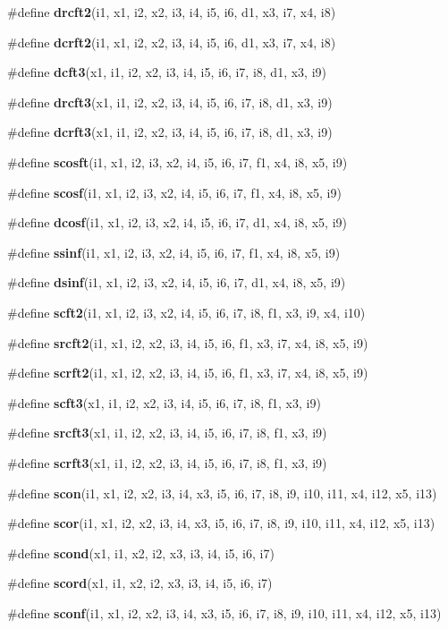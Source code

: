 \begin{CompactItemize}
\item 
\#define {\bf drcft2}(i1, x1, i2, x2, i3, i4, i5, i6, d1, x3, i7, x4, i8)
\item 
\#define {\bf dcrft2}(i1, x1, i2, x2, i3, i4, i5, i6, d1, x3, i7, x4, i8)
\item 
\#define {\bf dcft3}(x1, i1, i2, x2, i3, i4, i5, i6, i7, i8, d1, x3, i9)
\item 
\#define {\bf drcft3}(x1, i1, i2, x2, i3, i4, i5, i6, i7, i8, d1, x3, i9)
\item 
\#define {\bf dcrft3}(x1, i1, i2, x2, i3, i4, i5, i6, i7, i8, d1, x3, i9)
\item 
\#define {\bf scosft}(i1, x1, i2, i3, x2, i4, i5, i6, i7, f1, x4, i8, x5, i9)
\item 
\#define {\bf scosf}(i1, x1, i2, i3, x2, i4, i5, i6, i7, f1, x4, i8, x5, i9)
\item 
\#define {\bf dcosf}(i1, x1, i2, i3, x2, i4, i5, i6, i7, d1, x4, i8, x5, i9)
\item 
\#define {\bf ssinf}(i1, x1, i2, i3, x2, i4, i5, i6, i7, f1, x4, i8, x5, i9)
\item 
\#define {\bf dsinf}(i1, x1, i2, i3, x2, i4, i5, i6, i7, d1, x4, i8, x5, i9)
\item 
\#define {\bf scft2}(i1, x1, i2, i3, x2, i4, i5, i6, i7, i8, f1, x3, i9, x4, i10)
\item 
\#define {\bf srcft2}(i1, x1, i2, x2, i3, i4, i5, i6, f1, x3, i7, x4, i8, x5, i9)
\item 
\#define {\bf scrft2}(i1, x1, i2, x2, i3, i4, i5, i6, f1, x3, i7, x4, i8, x5, i9)
\item 
\#define {\bf scft3}(x1, i1, i2, x2, i3, i4, i5, i6, i7, i8, f1, x3, i9)
\item 
\#define {\bf srcft3}(x1, i1, i2, x2, i3, i4, i5, i6, i7, i8, f1, x3, i9)
\item 
\#define {\bf scrft3}(x1, i1, i2, x2, i3, i4, i5, i6, i7, i8, f1, x3, i9)
\item 
\#define {\bf scon}(i1, x1, i2, x2, i3, i4, x3, i5, i6, i7, i8, i9, i10, i11, x4, i12, x5, i13)
\item 
\#define {\bf scor}(i1, x1, i2, x2, i3, i4, x3, i5, i6, i7, i8, i9, i10, i11, x4, i12, x5, i13)
\item 
\#define {\bf scond}(x1, i1, x2, i2, x3, i3, i4, i5, i6, i7)
\item 
\#define {\bf scord}(x1, i1, x2, i2, x3, i3, i4, i5, i6, i7)
\item 
\#define {\bf sconf}(i1, x1, i2, x2, i3, i4, x3, i5, i6, i7, i8, i9, i10, i11, x4, i12, x5, i13)

\end{CompactItemize}
